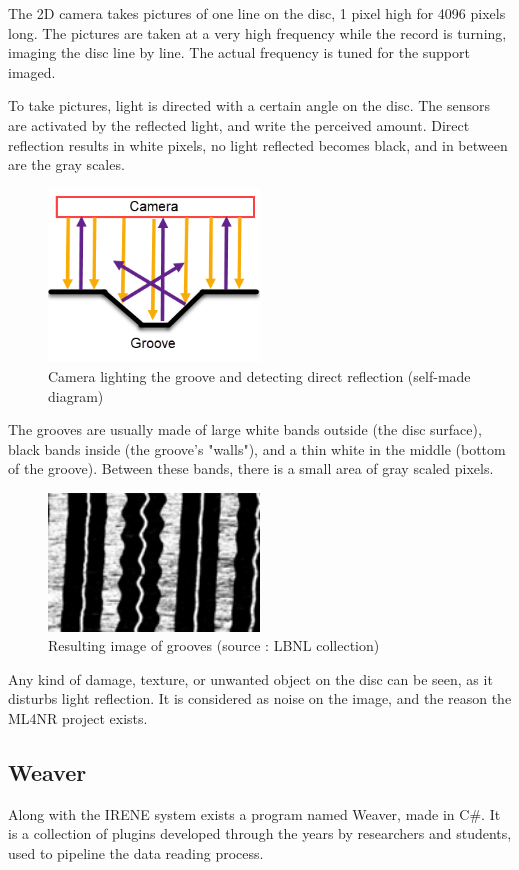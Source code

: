 \documentclass[12pt, twoside]{article}
\begin{document}
The 2D camera takes pictures of one line on the disc, 1 pixel high for 4096 pixels long. The pictures are taken at a very high frequency while the record is turning, imaging the disc line by line. The actual frequency is tuned for the support imaged.

To take pictures, light is directed with a certain angle on the disc. The sensors are activated by the reflected light, and write the perceived amount. Direct reflection results in white pixels, no light reflected becomes black, and in between are the gray scales.
\begin{figure}[H]
	\centering
	\includegraphics[width=0.5\textwidth]{../images/grooveside.png}
	\caption{Camera lighting the groove and detecting direct reflection (self-made diagram)}
	\label{grooveside}
\end{figure}
The grooves are usually made of large white bands outside (the disc surface), black bands inside (the groove's "walls"), and a thin white in the middle (bottom of the groove). Between these bands, there is a small area of gray scaled pixels.
\begin{figure}[H]
	\centering
	\includegraphics[width=0.5\textwidth]{../images/groove.png}
	\caption{Resulting image of grooves (source : LBNL collection)}
	\label{groove}
\end{figure}
Any kind of damage, texture, or unwanted object on the disc can be seen, as it disturbs light reflection. It is considered as noise on the image, and the reason the ML4NR project exists.
\subsection{Weaver}
Along with the IRENE system exists a program named Weaver, made in C\#. It is a collection of plugins developed through the years by researchers and students, used to pipeline the data reading process. 
\end{document}
